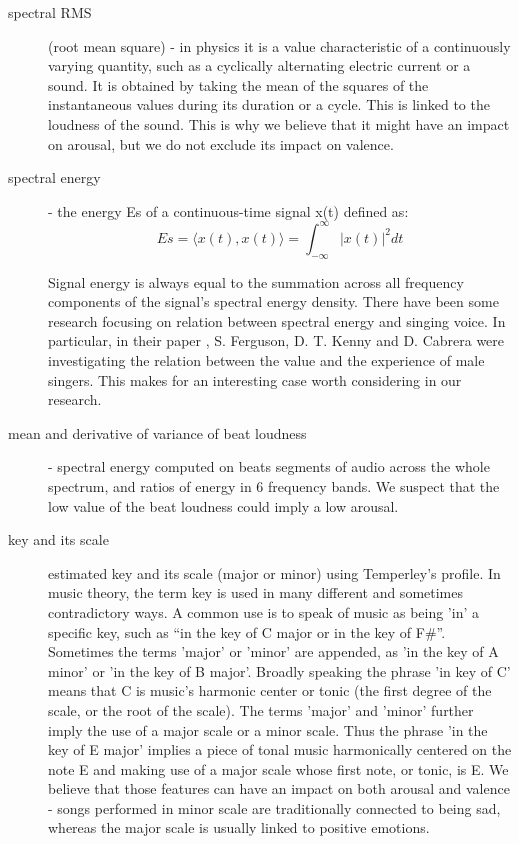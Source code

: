 \begin{description}
\item[spectral RMS] (root mean square) - in physics it is a value characteristic of a continuously varying quantity, such as a cyclically alternating electric current or a sound. It is obtained by taking the mean of the squares of the instantaneous values during its duration or a cycle. This is linked to the loudness of the sound. This is why we believe that it might have an impact on arousal, but we do not exclude its impact on valence.

\item[spectral energy] - the energy E{s} of a continuous-time signal x(t) defined as: 
\begin{equation}
E{s}  =  \langle x(t), x(t)\rangle =  \int_{-\infty}^{\infty}{|x(t)|^2}dt
\end{equation}

Signal energy is always equal to the summation across all frequency components of the signal's spectral energy density. 
There have been some research focusing on relation between spectral energy and singing voice. In particular, in their paper \cite{spectralenergy}, S. Ferguson, D. T. Kenny and D. Cabrera were investigating the relation between the value and the experience of male singers. This makes for an interesting case worth considering in our research.

\item[mean and derivative of variance of beat loudness] -  spectral energy computed on beats segments of audio across the whole spectrum, and ratios of energy in 6 frequency bands. We suspect that the low value of the beat loudness could imply a low arousal.

\item[key and its scale] estimated key and its scale (major or minor) using Temperley’s profile. 
In music theory, the term key is used in many different and sometimes contradictory ways. A common use is to speak of music as being 'in' a specific key, such as ``in the key of C major or in the key of F\#''. Sometimes the terms 'major' or 'minor' are appended, as 'in the key of A minor' or 'in the key of B major'.
Broadly speaking the phrase 'in key of C' means that C is music's harmonic center or tonic (the first degree of the scale, or the root of the scale). 
The terms 'major' and 'minor' further imply the use of a major scale or a minor scale. Thus the phrase 'in the key of E major' implies a piece of tonal music harmonically centered on the note E and making use of a major scale whose first note, or tonic, is E. 
We believe that those features can have an impact on both arousal and valence - songs performed in minor scale are traditionally connected to being sad, whereas the major scale is usually linked to positive emotions.


\end{description}
